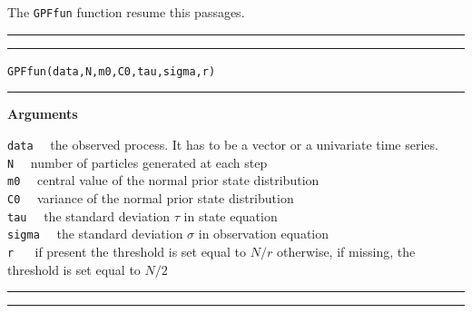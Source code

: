 \documentclass[
]{book}
\theoremstyle{break}
\theoremstyle{nonumberplain}
\begin{document}
The \texttt{GPFfun} function resume this passages.\\

\hrule
\hrule

\hfill\break
\texttt{GPFfun(data,N,m0,C0,tau,sigma,r)}\\

\hrule

\textbf{Arguments}

\texttt{data} ~~the observed process. It has to be a vector or a
univariate time series.\\
\texttt{N} ~~number of particles generated at each step\\
\texttt{m0} ~~central value of the normal prior state distribution\\
\texttt{C0} ~~variance of the normal prior state distribution\\
\texttt{tau} ~~the standard deviation \(\tau\) in state equation\\
\texttt{sigma} ~~the standard deviation \(\sigma\) in observation
equation\\
\texttt{r} ~~ if present the threshold is set equal to \(N/r\)
otherwise, if missing, the threshold is set equal to \(N/2\)

\hrule
\hrule
\end{document}
